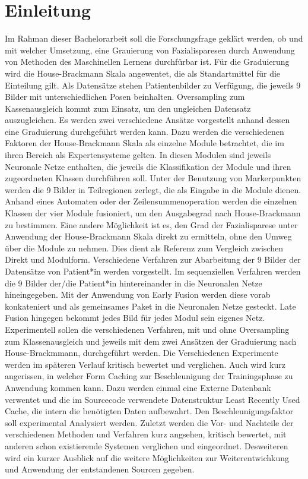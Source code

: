 
\chapter{Einleitung}
\label{einleitung}

Im Rahman dieser Bachelorarbeit soll die Forschungsfrage geklärt werden, ob und mit welcher Umsetzung, eine Grauierung von Fazialisparesen durch Anwendung von Methoden des Maschinellen Lernens durchfürbar ist. Für die Graduierung wird die House-Brackmann Skala angewentet, die als Standartmittel für die Einteilung gilt. Als Datensätze stehen Patientenbilder zu Verfügung, die jeweils 9 Bilder mit unterschiedlichen Posen beinhalten. Oversampling zum Kassenausgleich kommt zum Einsatz, um den ungleichen Datensatz auszugleichen.
Es werden zwei verschiedene Ansätze vorgestellt anhand dessen eine Graduierung durchgeführt werden kann. Dazu werden die verschiedenen Faktoren der House-Brackmann Skala als einzelne Module betrachtet, die im ihren Bereich als Expertensysteme gelten. In diesen Modulen sind jeweils Neuronale Netze enthalten, die jeweils die Klassifikation der Module und ihren zugeordneten Klassen durchführen soll. Unter der Benutzung von Markerpunkten werden die 9 Bilder in Teilregionen zerlegt, die als Eingabe in die Module dienen. Anhand eines Automaten oder der Zeilensummenoperation werden die einzelnen Klassen der vier Module fusioniert, um den Ausgabegrad nach House-Brackmann zu bestimmen. Eine andere Möglichkeit ist es, den Grad der Fazialisparese unter Anwendung der House-Brackmann Skala direkt zu ermitteln, ohne den Umweg über die Module zu nehmen. Dies dient als Referenz zum Vergleich zwischen Direkt und Modulform.
Verschiedene Verfahren zur Abarbeitung der 9 Bilder der Datensätze von Patient*in werden vorgestellt. Im sequenziellen Verfahren werden die 9 Bilder der/die Patient*in hintereinander in die Neuronalen Netze hineingegeben. Mit der Anwendung von Early Fusion werden diese vorab konkateniert und als gemeinsames Paket in die Neuronalen Netze gesteckt. Late Fusion hingegen bekommt jedes Bild für jedes Modul sein eigenes Netz. Experimentell sollen die verschiedenen Verfahren, mit und ohne Oversampling zum Klassenausgleich und jeweils mit dem zwei Ansätzen der Graduierung nach House-Brackmmann, durchgeführt werden. Die Verschiedenen Experimente werden im späteren Verlauf kritisch bewertet und verglichen.
Auch wird kurz angerissen, in welcher Form Caching zur Beschleunigung der Trainingsphase zu Anwendung kommen kann. Dazu werden einmal eine Externe Datenbank verwentet und die im Sourcecode verwendete Datenstruktur Least Recently Used Cache, die intern die benötigten Daten aufbewahrt. Den Beschleunigungsfaktor soll experimental Analysiert werden.
Zuletzt werden die Vor- und Nachteile der verschiedenen Methoden und Verfahren kurz angsehen, kritisch bewertet, mit anderen schon existierende Systemen verglichen und eingeordnet. Desweiteren wird ein kurzer Ausblick auf die weitere Möglichkeiten zur Weiterentwichkung und Anwendung der entstandenen Sourcen gegeben.
